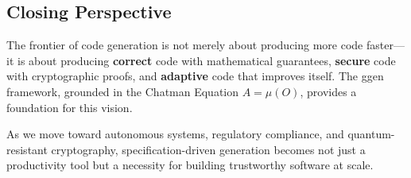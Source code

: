\subsection{Closing Perspective}

The frontier of code generation is not merely about producing more code faster—it is about producing \textbf{correct} code with mathematical guarantees, \textbf{secure} code with cryptographic proofs, and \textbf{adaptive} code that improves itself. The ggen framework, grounded in the Chatman Equation $A = \mu(O)$, provides a foundation for this vision.

As we move toward autonomous systems, regulatory compliance, and quantum-resistant cryptography, specification-driven generation becomes not just a productivity tool but a necessity for building trustworthy software at scale.
